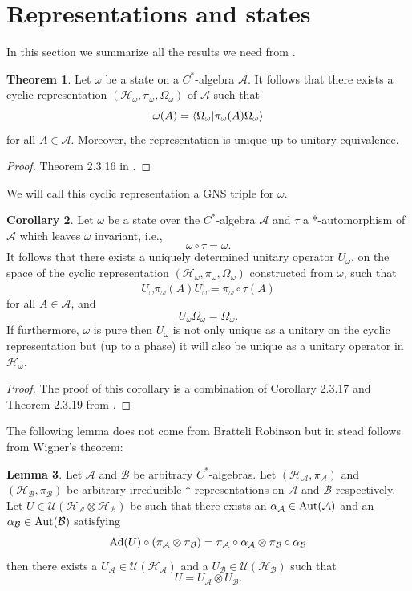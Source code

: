 \documentclass[12pt,a4paper,twoside]{article}
\let\originalleft\left
\let\originalright\right
\renewcommand{\left}{\mathopen{}\mathclose\bgroup\originalleft}
\renewcommand{\right}{\aftergroup\egroup\originalright}
\newcommand{\UU}{\mathcal U}
\newcommand{\BB}{\mathcal B}
\newcommand{\HH}{\mathcal H}
\renewcommand{\AA}{\mathcal A}
\newcommand{\Ad}[1]{\textrm{Ad}\left(#1\right)}
\newcommand{\Aut}[1]{\textrm{Aut}\left(#1\right)}
\theoremstyle{definition}
\newtheorem{theorem}{Theorem}[section]
\newtheorem{lemma}[theorem]{Lemma}
\newtheorem{corollary}[theorem]{Corollary}
\numberwithin{equation}{section}
\begin{document}
\section{Representations and states}
In this section we summarize all the results we need from \cite{bratteli1979operator}.
\begin{theorem}\label{thrm:ExistenceGNS}
	Let $\omega$ be a state on a $C^*$-algebra $\AA$. It follows that there exists a cyclic representation $(\HH_\omega,\pi_\omega,\Omega_\omega)$ of $\AA$ such that
	\[\omega(A)=\bra{\Omega_\omega}\ket{\pi_\omega(A)\Omega_\omega}\]
	for all $A\in\AA$. Moreover, the representation is unique up to unitary equivalence.
\end{theorem}
\begin{proof}
	Theorem 2.3.16 in \cite{bratteli1979operator}.
\end{proof}
We will call this cyclic representation a GNS triple for $\omega$.
\begin{corollary}\label{cor:ExistenceOfUnitary}
	Let $\omega$ be a state over the $C^*$-algebra $\AA$ and $\tau$ a *-automorphism of $\AA$ which leaves $\omega$ invariant, i.e.,
	\[\omega\circ\tau=\omega.\]
	It follows that there exists a uniquely determined unitary operator $U_\omega$, on the space of the cyclic representation $(\HH_\omega,\pi_\omega,\Omega_\omega)$ constructed from $\omega$, such that
	\[U_\omega \pi_\omega(A)U_\omega^\dagger=\pi_\omega\circ\tau(A) \]
	for all $A\in\AA$, and
	\[U_\omega\Omega_\omega=\Omega_\omega. \]
	If furthermore, $\omega$ is pure then $U_\omega$ is not only unique as a unitary on the cyclic representation but (up to a phase) it will also be unique as a unitary operator in $\HH_\omega$.
\end{corollary}
\begin{proof}
	The proof of this corollary is a combination of Corollary 2.3.17 and Theorem 2.3.19 from \cite{bratteli1979operator}.
\end{proof}
The following lemma does not come from Bratteli Robinson but in stead follows from Wigner's theorem:
\begin{lemma}\label{lem:SplittingOfUnitary}
	Let $\AA$ and $\BB$ be arbitrary $C^*$-algebras. Let $(\HH_\AA,\pi_\AA)$ and $(\HH_\BB,\pi_\BB)$ be arbitrary irreducible $*$ representations on $\AA$ and $\BB$ respectively. Let $U\in\UU(\HH_\AA\otimes\HH_\BB)$ be such that there exists an $\alpha_\AA\in\Aut{\AA}$ and an $\alpha_\BB\in\Aut{\BB}$ satisfying
	\begin{equation}
		\Ad{U}\circ(\pi_\AA\otimes\pi_\BB)=\pi_\AA\circ\alpha_\AA\otimes\pi_\BB\circ\alpha_\BB
	\end{equation}
	then there exists a $U_\AA\in\UU(\HH_\AA)$ and a $U_\BB\in\UU(\HH_\BB)$ such that
	\begin{equation}
		U=U_\AA\otimes U_\BB.
	\end{equation}
\end{lemma}
\end{document}
